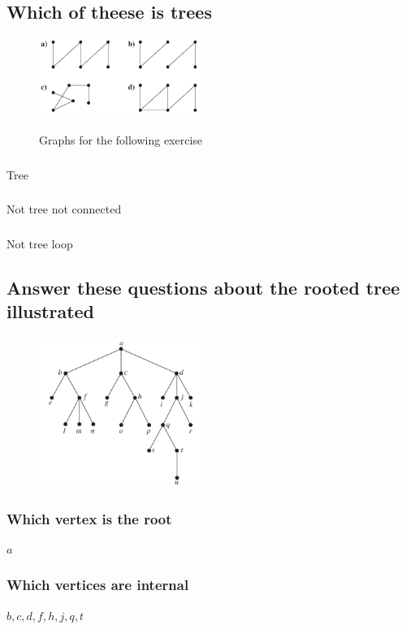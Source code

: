\documentclass[12pt, a4paper]{report}
\begin{document}
		\subsection{Which of theese is trees}
			\begin{figure}[h!]
				\centering
				\includegraphics[width=200px]{assets/11,1,1.png}
				\label{}
				\caption{Graphs for the following exercise}
			\end{figure}	
			\subsubsection{}
				Tree
			\subsubsection{}
				Not tree not connected
			\setcounter{subsubsection}{3}
			\subsubsection{}
				Not tree loop
		\setcounter{subsection}{2}
		\subsection{Answer these questions about the rooted tree illustrated}
			\begin{figure}[h!]
				\centering
				\includegraphics[width=200px]{assets/11,1,3.png}
				\label{}
				\caption{}
			\end{figure}
			\subsubsection{Which vertex is the root}
				$a$
			\subsubsection{Which vertices are internal}
				$b,c,d,f,h,j,q,t$
\end{document}
